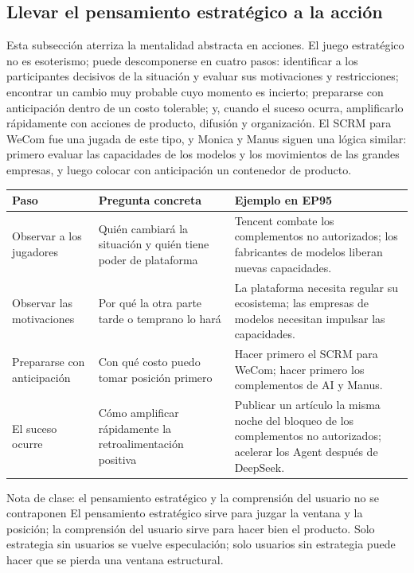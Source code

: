 \documentclass[a4paper]{article}
\begin{document}
\subsection{Llevar el pensamiento estratégico a la acción}

Esta subsección aterriza la mentalidad abstracta en acciones. El juego estratégico no es esoterismo; puede descomponerse en cuatro pasos: identificar a los participantes decisivos de la situación y evaluar sus motivaciones y restricciones; encontrar un cambio muy probable cuyo momento es incierto; prepararse con anticipación dentro de un costo tolerable; y, cuando el suceso ocurra, amplificarlo rápidamente con acciones de producto, difusión y organización. El SCRM para WeCom fue una jugada de este tipo, y Monica y Manus siguen una lógica similar: primero evaluar las capacidades de los modelos y los movimientos de las grandes empresas, y luego colocar con anticipación un contenedor de producto.

\noindent\begin{tabularx}{\textwidth}{p{}p{}X}
\toprule
Paso & Pregunta concreta & Ejemplo en EP95 \\
\midrule
Observar a los jugadores & Quién cambiará la situación y quién tiene poder de plataforma & Tencent combate los complementos no autorizados; los fabricantes de modelos liberan nuevas capacidades. \\
Observar las motivaciones & Por qué la otra parte tarde o temprano lo hará & La plataforma necesita regular su ecosistema; las empresas de modelos necesitan impulsar las capacidades. \\
Prepararse con anticipación & Con qué costo puedo tomar posición primero & Hacer primero el SCRM para WeCom; hacer primero los complementos de AI y Manus. \\
El suceso ocurre & Cómo amplificar rápidamente la retroalimentación positiva & Publicar un artículo la misma noche del bloqueo de los complementos no autorizados; acelerar los Agent después de DeepSeek. \\
\bottomrule
\end{tabularx}

\begin{knowledgebox}{Nota de clase: el pensamiento estratégico y la comprensión del usuario no se contraponen}
El pensamiento estratégico sirve para juzgar la ventana y la posición; la comprensión del usuario sirve para hacer bien el producto. Solo estrategia sin usuarios se vuelve especulación; solo usuarios sin estrategia puede hacer que se pierda una ventana estructural.
\end{knowledgebox}
\end{document}
